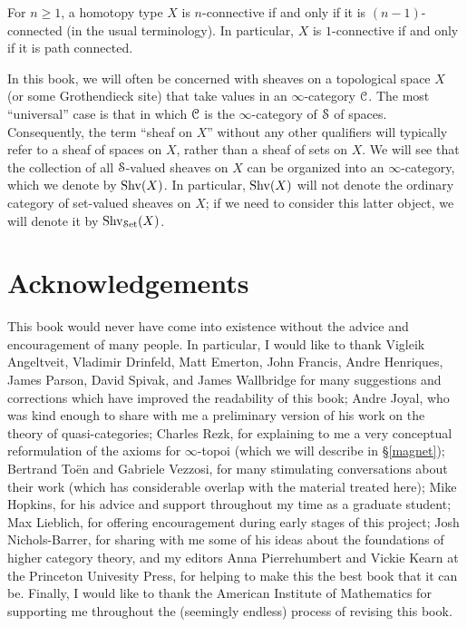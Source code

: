\begin{remark2}
For $n \geq 1$, a homotopy type $X$ is $n$-connective if and only if it is $(n-1)$-connected (in the usual terminology). In particular, $X$ is $1$-connective if and only if it is path connected.
\end{remark2}

\begin{warning2}
In this book, we will often be concerned with sheaves on a topological space $X$ (or some Grothendieck site) that take values in an $\infty$-category $\operatorname{\mathcal{C}}$. The most ``universal'' case is that in which $\operatorname{\mathcal{C}}$ is the $\infty$-category of $\operatorname{\mathcal{S}}$ of spaces. Consequently, the term ``sheaf on $X$''
without any other qualifiers will typically refer to a sheaf of spaces on $X$, rather than a sheaf of sets on $X$. We will see that the collection of all $\operatorname{\mathcal{S}}$-valued sheaves on $X$ can be organized into an
$\infty$-category, which we denote by $\operatorname{Shv}(X)$. In particular, $\operatorname{Shv}(X)$ will not denote the ordinary category of set-valued sheaves on $X$; if we need to consider this latter object, we will denote it
by $\operatorname{Shv}_{\operatorname{\mathcal{S}et}}(X)$. 
\end{warning2}

\section*{Acknowledgements}

This book would never have come into existence without the advice and encouragement of many people. In particular, I would like to thank Vigleik Angeltveit, Vladimir Drinfeld, Matt Emerton, John Francis, Andre Henriques, James Parson, David Spivak, and James Wallbridge for many suggestions and corrections which have improved the readability of this book; Andre Joyal, who was kind enough to share with me a preliminary version of his work on the theory of quasi-categories; Charles Rezk, for explaining to me a very conceptual reformulation of the axioms for $\infty$-topoi (which we will describe in \S \ref{magnet}); Bertrand To\"{e}n and Gabriele Vezzosi, for many stimulating conversations about their work (which has considerable overlap with the material treated here); Mike Hopkins, for his advice and support throughout my time as a graduate student; Max Lieblich, for offering encouragement during early stages of this project; Josh Nichols-Barrer, for sharing with me some of his ideas about the foundations of higher category theory, and my editors Anna Pierrehumbert and Vickie Kearn at the Princeton Univesity Press, for helping to make this the best book that it can be. Finally, I would like to thank the American Institute of Mathematics for supporting me throughout the (seemingly endless) process of revising this book.
